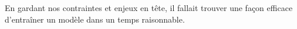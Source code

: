 En gardant nos contraintes et enjeux en tête, il fallait trouver une façon efficace d'entraîner un modèle dans un temps raisonnable.